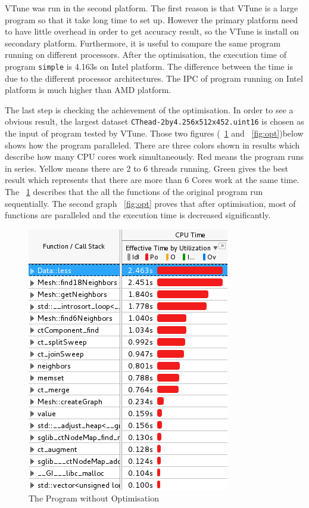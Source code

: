 \documentclass[conference]{IEEEtran}
\newcommand{\fref}[1]{\figurename~\ref{#1}}
\begin{document}
VTune was run in the second platform. The first reason is that VTune is a large program so that it take long time to set up. However the primary platform need to have little overhead in order to get accuracy result, so the VTune is install on secondary platform. Furthermore, it is useful to compare the same program running on different processors. After the optimisation, the execution time of program \texttt{simple} is 4.163s on Intel platform. The difference between the time is due to the different processor architectures. The IPC of program running on Intel platform is much higher than AMD platform. 

The last step is checking the achievement of the optimisation. In order to see a obvious result, the largest dataset \texttt{CThead-2by4.256x512x452.uint16} is chosen as the input of program tested by VTune. Those two figures (\fref{fig:noopt} and \fref{fig:opt})below shows how the program  paralleled. There are three colors shown in results which describe how many CPU cores work simultaneously. Red means the program runs in series. Yellow means there are 2 to 6 threads running. Green gives the best result which represents that there are more than 6 Cores work at the same time. The \fref{fig:noopt} describes that the all the functions of the original program run sequentially. The second graph \fref{fig:opt} proves that after optimisation, most of functions are paralleled and the execution time is decreased significantly. 
\begin{figure}[!h]
	\centering
	\includegraphics[width=\columnwidth]{noopt_vtune}
	\caption{The Program without Optimisation}
	\label{fig:noopt}
\end{figure}
\end{document}
